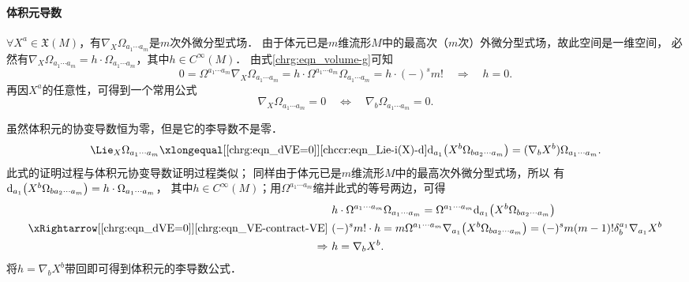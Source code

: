 \paragraph{体积元导数}
$\forall X^a\in \mathfrak{X}(M)$，有$\nabla_X\Omega_{a_1 \cdots a_m}$是$m$次外微分型式场．
由于体元已是$m$维流形$M$中的最高次（$m$次）外微分型式场，故此空间是一维空间，
必然有$\nabla_X\Omega_{a_1 \cdots a_m} = h\cdot \Omega_{a_1 \cdots a_m}$，其中$h\in C^\infty(M)$．
由式\eqref{chrg:eqn_volume-g}可知
\begin{equation*}
    0= \Omega^{a_1 \cdots a_m} \nabla_X\Omega_{a_1 \cdots a_m}
    = h \cdot \Omega^{a_1 \cdots a_m} \Omega_{a_1 \cdots a_m}
    = h\cdot (-)^s m! 
    \quad \Rightarrow\quad h=0.
\end{equation*}
再因$X^a$的任意性，可得到一个常用公式
\begin{equation}\label{chrg:eqn_dVE=0}
    \nabla_X\Omega_{a_1 \cdots a_m} = 0 \quad \Leftrightarrow \quad
    \nabla_b\Omega_{a_1 \cdots a_m} = 0 .
\end{equation}

虽然体积元的协变导数恒为零，但是它的李导数不是零．
\begin{equation}\label{chrg:eqn_LieDVE}
    \Lie_{X} \Omega_{a_1 \cdots a_m}
    \xlongequal[\ref{chrg:eqn_dVE=0}]{\ref{chccr:eqn_Lie-i(X)-d}}
    {\rm d}_{a_1}\bigl(X^b \Omega_{ba_2 \cdots a_m} \bigr)
    = (\nabla_{b}X^b) \Omega_{a_1 \cdots a_m}  .
\end{equation}
此式的证明过程与体积元协变导数证明过程类似；
同样由于体元已是$m$维流形$M$中的最高次外微分型式场，所以
有${\rm d}_{a_1}\bigl(X^b \Omega_{ba_2 \cdots a_m} \bigr) = h\cdot \Omega_{a_1 \cdots a_m}$，
其中$h\in C^\infty(M)$；用$\Omega^{a_1 \cdots a_m}$缩并此式的等号两边，可得
\begin{align*}
   \ & h\cdot \Omega^{a_1 \cdots a_m} \Omega_{a_1 \cdots a_m}
   =\Omega^{a_1 \cdots a_m} {\rm d}_{a_1}\bigl(X^b \Omega_{ba_2 \cdots a_m} \bigr) \\
    \xRightarrow[\ref{chrg:eqn_dVE=0}]{\ref{chrg:eqn_VE-contract-VE}}\ & 
    (-)^s m! \cdot h 
    =  m \Omega^{a_1 \cdots a_m} \nabla_{a_1}\bigl(X^b \Omega_{ba_2 \cdots a_m} \bigr)
    =(-)^s m (m-1)! \delta_{b}^{a_1} \nabla_{a_1}X^b \\
    \Rightarrow \  & h = \nabla_{b}X^b .
\end{align*}  %
将$h = \nabla_{b}X^b$带回即可得到体积元的李导数公式．



